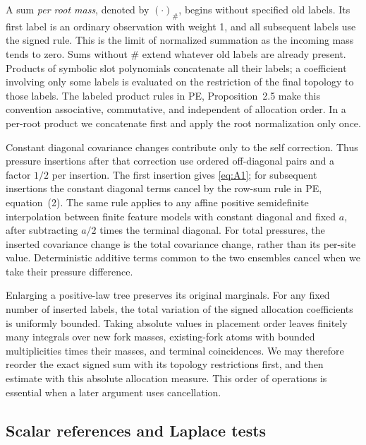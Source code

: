 A sum \emph{per root mass}, denoted by \((\cdot)_\#\), begins without
specified old labels. Its first label is an ordinary observation with
weight 1, and all subsequent labels use the signed rule. This is the
limit of normalized summation as the incoming mass tends to zero. Sums
without \(\#\) extend whatever old labels are already present.
Products of symbolic slot polynomials concatenate all their labels;
a coefficient involving only some labels is evaluated on the restriction
of the final topology to those labels. The labeled product rules in PE,
Proposition~2.5 make this convention associative, commutative, and
independent of allocation order. In a per-root product we concatenate first and apply the root
normalization only once.

Constant diagonal covariance changes contribute only to the self
correction. Thus pressure insertions after that correction use ordered
off-diagonal pairs and a factor \(1/2\) per insertion. The first
insertion gives \eqref{eq:A1}; for subsequent insertions the constant
diagonal terms cancel by the row-sum rule in PE, equation~(2). The same
rule applies to any affine positive semidefinite interpolation between
finite feature models with constant diagonal and fixed \(a\), after
subtracting \(a/2\) times the terminal diagonal. For total pressures,
the inserted covariance change is the total covariance change, rather
than its per-site value. Deterministic additive terms common to the two
ensembles cancel when we take their pressure difference.

Enlarging a positive-law tree preserves its original marginals. For any
fixed number of inserted labels, the total variation of the signed
allocation coefficients is uniformly bounded. Taking absolute values
in placement order leaves finitely many integrals over new fork masses,
existing-fork atoms with bounded multiplicities times their masses,
and terminal coincidences. We may therefore reorder the exact signed
sum with its topology restrictions first, and then estimate with this
absolute allocation measure. This order of operations is essential
when a later argument uses cancellation.

\subsection{Scalar references and Laplace tests}

